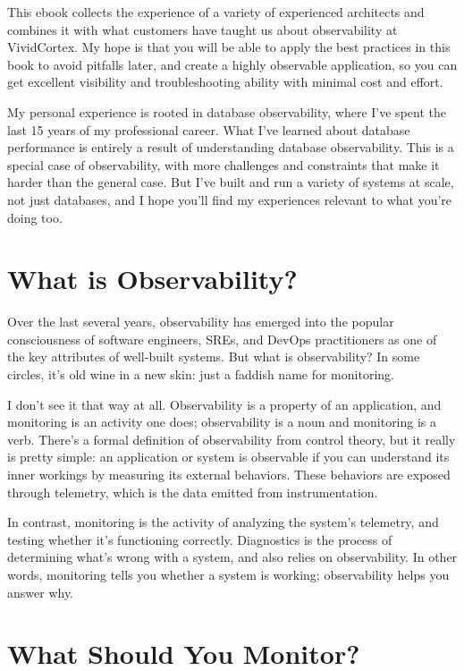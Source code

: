 \documentclass{vivid_layout}
\begin{document}
This ebook collects the experience of a variety of experienced architects and
combines it with what customers have taught us about observability at
VividCortex. My hope is that you will be able to apply the best practices in
this book to avoid pitfalls later, and create a highly observable
application, so you can get excellent visibility and troubleshooting ability with
minimal cost and effort. 

My personal experience is rooted in database observability, where I've spent the last 15
years of my professional career. What I've learned about database performance is
entirely a result of understanding database observability. This is a special case
of observability, with more challenges and constraints that make it harder than the general case. But I've built and run a variety of systems at scale, not just databases, and I hope you'll find my experiences relevant to what you're doing too.

\section{What is Observability?}

Over the last several years, observability has emerged into the popular consciousness
of software engineers, SREs, and DevOps practitioners as one of the key attributes
of well-built systems. But what is observability? In some circles, it's old wine in a
new skin: just a faddish name for monitoring.

I don't see it that way at all. Observability is a property of an application, and monitoring is an activity one does; observability is a noun and monitoring is a verb. There's a formal definition of observability from control theory, but it really is pretty simple: an application or system is observable if you can understand its inner workings by measuring its external behaviors. These behaviors are exposed through telemetry, which is the data emitted from instrumentation.

In contrast, monitoring is the activity of analyzing the system's telemetry, and testing whether it's functioning correctly. Diagnostics is the process of determining what’s wrong with a system, and also relies on observability. In other words, monitoring tells you whether a system is working; observability helps you answer why.

\section{What Should You Monitor?}
\end{document}
